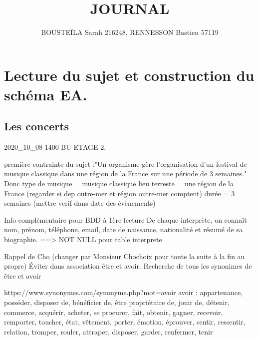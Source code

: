 \documentclass[12pt,a4paper]{article}
\begin{document}
\pagecolor{noir_gris}
{\color{vert_olive}

{\color{orange}
\title{JOURNAL}%
\author{BOUSTEÏLA Sarah 216248, RENNESSON Bastien 57119}%
\maketitle
}




\section{Lecture du sujet et construction du schéma EA.}
\subsection{Les concerts}
2020_10_08 1400 BU ETAGE 2, 

première contrainte du sujet :"Un organisme gère l'organisation d'un festival de musique classique dans une région de la France sur une période de 3 semaines."
Donc 
type de musique = musique classique
lieu terreste = une région de la France (regarder si dep outre-mer et région outre-mer comptent)
durée = 3 semaines (mettre verif dans date des évènements)


Info complémentaire pour BDD à 1ère lecture
De chaque interprète, on connaît nom, prénom, téléphone, email, date de naissance, nationalité et résumé de sa biographie. ==> NOT NULL pour table interprete







Rappel de Cho (changer par Monsieur Chochoix pour toute la suite à la fin au propre)
Éviter dans association être et avoir.
Recherche de tous les synonimes de être et avoir

https://www.synonymes.com/synonyme.php?mot=avoir
avoir : 
appartenance, posséder, disposer de, bénéficier de, être propriétaire de, jouir de, détenir, commerce, acquérir, acheter, se procurer, fait, obtenir, gagner, recevoir, remporter, toucher, état, vêtement, porter, émotion, éprouver, sentir, ressentir, relation, tromper, rouler, attraper, disposer, garder, renfermer, tenir

}
\end{document}
